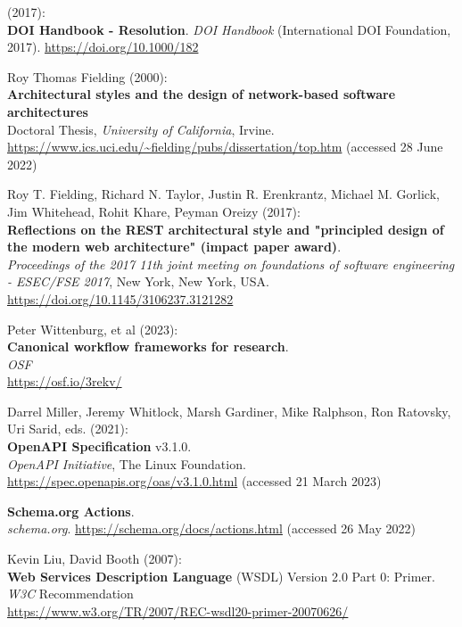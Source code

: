 \begin{thebibliography}{9}
(2017): \\
\textbf{{DOI Handbook} - {Resolution}}. \emph{{DOI Handbook}}
({International DOI Foundation}, 2017).
\url{https://doi.org/10.1000/182}

Roy Thomas Fielding (2000): \\
\textbf{Architectural styles and the design
of network-based software architectures}\\
Doctoral Thesis, 
\emph{University of California}, Irvine.
\url{https://www.ics.uci.edu/~fielding/pubs/dissertation/top.htm}
(accessed 28 June 2022)

Roy T. Fielding, Richard N. Taylor, Justin R. Erenkrantz, Michael M.
Gorlick, Jim Whitehead, Rohit Khare, Peyman Oreizy (2017): \\
\textbf{Reflections on the {REST} architectural style and "principled
design of the modern web architecture" (impact paper award)}. \\
\emph{Proceedings of the 2017 11th joint meeting on foundations of software engineering - {ESEC}/{FSE} 2017}, New York, New York, USA.\\
\url{https://doi.org/10.1145/3106237.3121282}

Peter Wittenburg, et al (2023): \\
\textbf{Canonical workflow frameworks for research}. \\
\emph{OSF}\\
\url{https://osf.io/3rekv/}

Darrel Miller, Jeremy Whitlock, Marsh Gardiner, Mike Ralphson, Ron
Ratovsky, Uri Sarid, eds. (2021): \\
\textbf{OpenAPI Specification} v3.1.0.\\
\emph{OpenAPI Initiative}, The Linux Foundation.
\url{https://spec.openapis.org/oas/v3.1.0.html} (accessed 21
March 2023)

\textbf{Schema.org {Actions}}.\\
\emph{schema.org}.
\url{https://schema.org/docs/actions.html} (accessed 26 May 2022)

Kevin Liu, David Booth (2007): \\
\textbf{Web Services Description Language} (WSDL) Version 2.0
Part 0: Primer. \\
\emph{W3C} Recommendation \\
\url{https://www.w3.org/TR/2007/REC-wsdl20-primer-20070626/}


\end{thebibliography}
